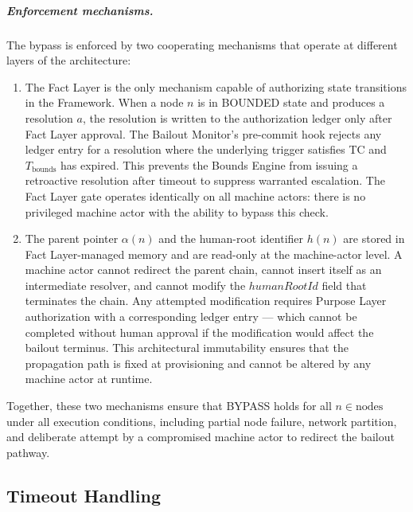 \subparagraph{Enforcement mechanisms.} The bypass is enforced by two cooperating mechanisms that operate at different layers of the \bxthree{} architecture:

\begin{enumerate}
\item[\textbf{Fact Layer gate (enforcement at the authorization layer).}] The Fact Layer is the only mechanism capable of authorizing state transitions in the \bxthree{} Framework. When a node $n$ is in BOUNDED state and produces a resolution $a$, the resolution is written to the authorization ledger only after Fact Layer approval. The Bailout Monitor's pre-commit hook rejects any ledger entry for a resolution where the underlying trigger satisfies TC and $T_{\text{bounds}}$ has expired. This prevents the Bounds Engine from issuing a retroactive resolution after timeout to suppress warranted escalation. The Fact Layer gate operates identically on all machine actors: there is no privileged machine actor with the ability to bypass this check.

\item[\textbf{Immutable parent-pointer and human-root architecture (enforcement at the data model layer).}] The parent pointer $\alpha(n)$ and the human-root identifier $h(n)$ are stored in Fact Layer-managed memory and are read-only at the machine-actor level. A machine actor cannot redirect the parent chain, cannot insert itself as an intermediate resolver, and cannot modify the $humanRootId$ field that terminates the chain. Any attempted modification requires Purpose Layer authorization with a corresponding ledger entry — which cannot be completed without human approval if the modification would affect the bailout terminus. This architectural immutability ensures that the propagation path is fixed at provisioning and cannot be altered by any machine actor at runtime.
\end{enumerate}

Together, these two mechanisms ensure that BYPASS holds for all $n \in \text{nodes}$ under all execution conditions, including partial node failure, network partition, and deliberate attempt by a compromised machine actor to redirect the bailout pathway.

\subsection{Timeout Handling}\label{sec:timeout-handling}

